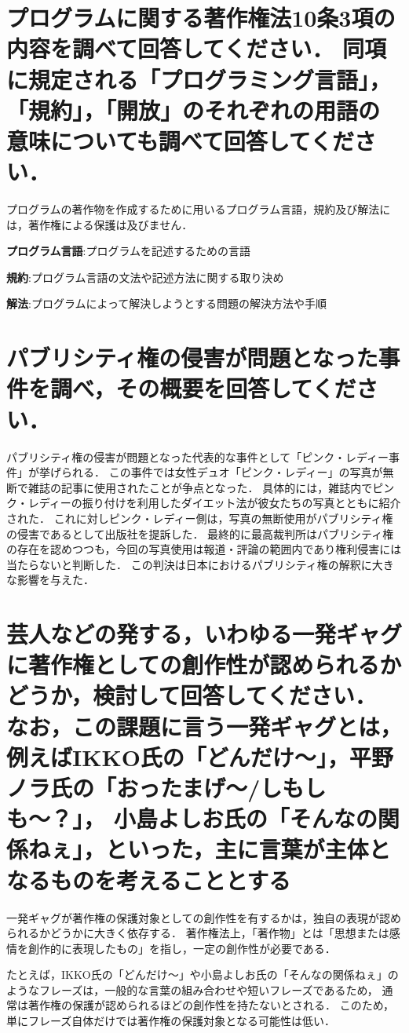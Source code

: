 \documentclass[titlepage,a4paper]{jsarticle}
\begin{document}
\section{プログラムに関する著作権法10条3項の内容を調べて回答してください．
  同項に規定される「プログラミング言語」，「規約」，「開放」のそれぞれの用語の意味についても調べて回答してください．}%
プログラムの著作物を作成するために用いるプログラム言語，規約及び解法には，著作権による保護は及びません．

\textbf{プログラム言語}:プログラムを記述するための言語

\textbf{規約}:プログラム言語の文法や記述方法に関する取り決め

\textbf{解法}:プログラムによって解決しようとする問題の解決方法や手順
\section{パブリシティ権の侵害が問題となった事件を調べ，その概要を回答してください．}
パブリシティ権の侵害が問題となった代表的な事件として「ピンク・レディー事件」が挙げられる．
この事件では女性デュオ「ピンク・レディー」の写真が無断で雑誌の記事に使用されたことが争点となった．
具体的には，雑誌内でピンク・レディーの振り付けを利用したダイエット法が彼女たちの写真とともに紹介された．
これに対しピンク・レディー側は，写真の無断使用がパブリシティ権の侵害であるとして出版社を提訴した．
最終的に最高裁判所はパブリシティ権の存在を認めつつも，今回の写真使用は報道・評論の範囲内であり権利侵害には当たらないと判断した．
この判決は日本におけるパブリシティ権の解釈に大きな影響を与えた\cite{4_1}．

\section{芸人などの発する，いわゆる一発ギャグに著作権としての創作性が認められるかどうか，検討して回答してください．
  なお，この課題に言う一発ギャグとは，例えばIKKO氏の「どんだけ〜」，平野ノラ氏の「おったまげ〜/しもしも〜？」，
  小島よしお氏の「そんなの関係ねぇ」，といった，主に言葉が主体となるものを考えることとする}
一発ギャグが著作権の保護対象としての創作性を有するかは，独自の表現が認められるかどうかに大きく依存する．
著作権法上，「著作物」とは「思想または感情を創作的に表現したもの」を指し，一定の創作性が必要である\cite{5_1}\cite{5_2}．

たとえば，IKKO氏の「どんだけ〜」や小島よしお氏の「そんなの関係ねぇ」のようなフレーズは，一般的な言葉の組み合わせや短いフレーズであるため，
通常は著作権の保護が認められるほどの創作性を持たないとされる．
このため，単にフレーズ自体だけでは著作権の保護対象となる可能性は低い\cite{5_3}．
\end{document}
